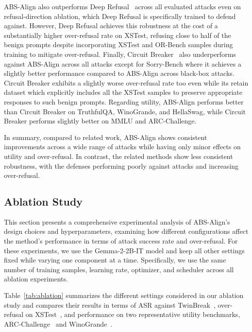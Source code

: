 ABS-Align also outperforms Deep Refusal~\cite{deeprefusal} across all evaluated attacks even on refusal-direction ablation, which Deep Refusal is specifically trained to defend against. However, Deep Refusal achieves this robustness at the cost of a substantially higher over-refusal rate on XSTest, refusing close to half of the benign prompts despite incorporating XSTest and OR-Bench samples during training to mitigate over-refusal. Finally, Circuit Breaker~\cite{zou2024circuit} also underperforms against ABS-Align across all attacks except for Sorry-Bench where it achieves a slightly better performance compared to ABS-Align across black-box attacks. Circuit Breaker exhibits a slightly worse over-refusal rate too even while its retain dataset which explicitly includes all the XSTest samples to preserve appropriate responses to such benign prompts. Regarding utility, ABS-Align performs better than Circuit Breaker on TruthfulQA, WinoGrande, and HellaSwag, while Circuit Breaker performs slightly better on MMLU and ARC-Challenge.

In summary, compared to related work, ABS-Align shows consistent improvements across a wide range of attacks while having only minor effects on utility and over-refusal. In contrast, the related methods show less consistent robustness, with the defenses performing poorly against attacks and increasing over-refusal.


\subsection{Ablation Study}
\label{subsec:ablation_study}


This section presents a comprehensive experimental analysis of ABS-Align's design choices and hyperparameters, examining how different configurations affect the method's performance in terms of attack success rate and over-refusal. For these experiments, we use the Gemma-2-2B-IT model and keep all other settings fixed while varying one component at a time. Specifically, we use the same number of training samples, learning rate, optimizer, and scheduler across all ablation experiments.




Table~\ref{tab:ablation} summarizes the different settings considered in our ablation study and compares their results in terms of ASR against TwinBreak~\cite{twinbreak}, over-refusal on XSTest~\cite{rottger2024xstest}, and performance on two representative utility benchmarks, ARC-Challenge~\cite{arc_challenge} and WinoGrande~\cite{WinoGrande}.



